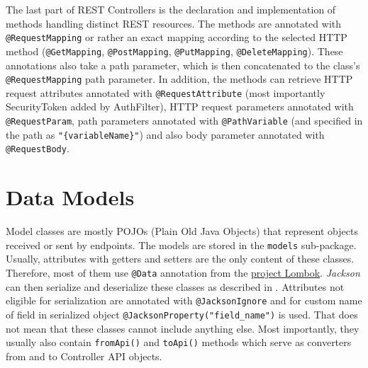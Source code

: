 The last part of REST Controllers is the declaration and implementation of methods handling distinct REST resources. The methods are annotated with \texttt{@RequestMapping} or rather an exact mapping according to the selected HTTP method (\texttt{@GetMapping}, \texttt{@PostMapping}, \texttt{@PutMapping}, \texttt{@DeleteMapping}).
These annotations also take a path parameter, which is then concatenated to the class’s \texttt{@RequestMapping} path parameter.
In addition, the methods can retrieve HTTP request attributes annotated with \texttt{@RequestAttribute} (most importantly SecurityToken added by AuthFilter), HTTP request parameters annotated with \texttt{@RequestParam}, path parameters annotated with \texttt{@PathVariable} (and specified in the path as \texttt{"\{variableName\}"}) and also body parameter annotated with \texttt{@RequestBody}.



\section{Data Models}
Model classes are mostly POJOs (Plain Old Java Objects) that represent objects received or sent by endpoints. The models are stored in the \texttt{models} sub-package. Usually, attributes with getters and setters are the only content of these classes. Therefore, most of them use \texttt{@Data} annotation from the \hyperref[sec:lombok]{project Lombok}.
\emph{Jackson} can then serialize and deserialize these classes as described in . Attributes not eligible for serialization are annotated with \texttt{@JacksonIgnore} and for custom name of field in serialized object \texttt{@JacksonProperty("field\_name")} is used.
That does not mean that these classes cannot include anything else. Most importantly, they usually also contain \texttt{fromApi()} and \texttt{toApi()} methods which serve as converters from and to Controller API objects.

